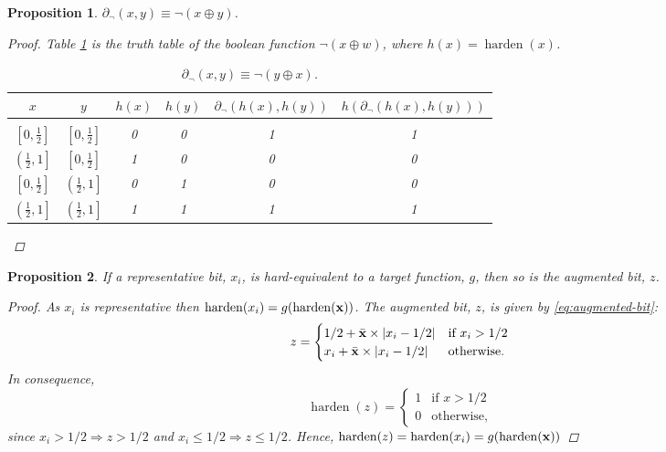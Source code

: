 \documentclass{article} %
\newtheorem{prop}{Proposition}
\begin{document}
\begin{prop}\label{prop:not}
	$\partial_{\neg}(x,y) \equiv \neg (x \oplus y)$.
\begin{proof}
	Table \ref{not-table} is the truth table of the boolean function $\neg (x \oplus w)$, where $h(x) = \operatorname{harden}(x)$.
	\begin{table}[t!]
		\begin{center}
			\begin{tabular}{cccccc}
				\multicolumn{1}{c}{$x$}  &\multicolumn{1}{c}{$y$}  &\multicolumn{1}{c}{$h(x)$}  &\multicolumn{1}{c}{$h(y)$} &\multicolumn{1}{c}{$\partial_{\neg}(h(x), h(y))$} &\multicolumn{1}{c}{$h(\partial_{\neg}(h(x), h(y)))$}
				\\ \hline \\
				$\left[0, \frac{1}{2}\right]$ & $\left[0, \frac{1}{2}\right]$ & 0 & 0 & 1 & 1\\[0.1cm]
				$\left(\frac{1}{2}, 1\right]$ & $\left[0, \frac{1}{2}\right]$ &1 & 0 & 0 & 0\\[0.1cm]
				$\left[0, \frac{1}{2}\right]$ & $\left(\frac{1}{2}, 1\right]$ &0 & 1 & 0 & 0\\[0.1cm]
				$\left(\frac{1}{2}, 1\right]$ & $\left(\frac{1}{2}, 1\right]$ &1 & 1 & 1 & 1\\[0.1cm]
			\end{tabular}
		\end{center}
		\caption{$\partial_{\neg}(x,y) \equiv \neg (y \oplus x)$.}\label{not-table}
	\end{table}
\end{proof}
\end{prop}

\begin{prop}\label{prop:augmented}
	If a representative bit, $x_{i}$, is hard-equivalent to a target function, $g$, then so is the augmented bit, $z$.
	\begin{proof}
		As $x_{i}$ is representative then $\operatorname{harden}(x_{i}) = g(\operatorname{harden}({\bf x}))$. The augmented bit, $z$, is given by  \eqref{eq:augmented-bit}:
		\begin{equation*}
		z = \begin{cases}
		1/2 + \bar{\bf x}\times|x_{i} - 1/2| & \text{if } x_{i} > 1/2 \\
		x_{i} + \bar{\bf x}\times|x_{i} - 1/2| & \text{otherwise.}
		\end{cases}
		\end{equation*}
		In consequence,
		\begin{equation*}
		\operatorname{harden}(z) = \begin{cases}
		1 & \text{if } x > 1/2 \\
		0 & \text{otherwise,}
		\end{cases}
		\end{equation*}
		since $x_{i} > 1/2 \Rightarrow z > 1/2$ and $x_{i} \leq 1/2 \Rightarrow z \leq 1/2$. Hence, $\operatorname{harden}(z) = \operatorname{harden}(x_{i}) = g(\operatorname{harden}({\bf x}))$
	\end{proof}
\end{prop}
\end{document}
